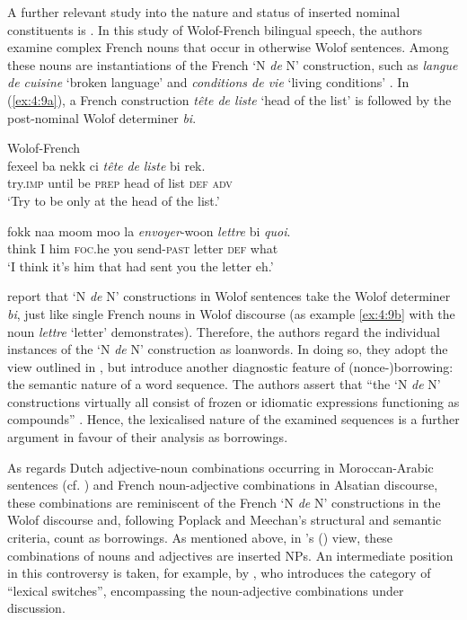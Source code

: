 A further relevant study into the nature and status of inserted nominal constituents is \citet{poplack-meechan-1995}. In this study of Wolof-French bilingual speech, the authors examine complex French nouns that occur in otherwise Wolof sentences. Among these nouns are instantiations of the French `N \textit{de} N' construction, such as \textit{langue de cuisine} `broken language' and \textit{conditions de vie} `living conditions' \citep[215]{poplack-meechan-1995}. In (\ref{ex:4:9a}), a French construction \textit{tête de liste} `head of the list' is followed by the post-nominal Wolof determiner \textit{bi}.

\ea Wolof-French \citep[215, 228]{poplack-meechan-1995}\\

\ea{\label{ex:4:9a}}
\gll fexeel ba nekk ci \textit{tête} \textit{de} \textit{liste} bi rek.\\
	try.\textsc{imp} until be \textsc{prep} head of list \textsc{def} \textsc{adv}\\
\glt `Try to be only at the head of the list.' 

\ex{\label{ex:4:9b}}
\gll fokk naa moom moo la \textit{envoyer}-woon \textit{lettre} bi \textit{quoi}.\\
	think I him \textsc{foc}.he you send-\textsc{past} letter \textsc{def} what\\
\glt `I think it's him that had sent you the letter eh.' 
\z

\z

\noindent \citet[215]{poplack-meechan-1995} report that `N \textit{de} N' constructions in Wolof sentences take the Wolof determiner \textit{bi}, just like single French nouns in Wolof discourse (as example \ref{ex:4:9b} with the noun \textit{lettre} `letter' demonstrates). Therefore, the authors regard the individual instances of the `N \textit{de} N' construction as loanwords. In doing so, they adopt the view outlined in \citet{sankoff-et-al-1990}, but introduce another diagnostic feature of (nonce-)borrowing: the semantic nature of a word sequence. The authors assert that ``the `N \textit{de} N' constructions virtually all consist of frozen or idiomatic expressions functioning as compounds'' \citep[][215]{poplack-meechan-1995}. Hence, the lexicalised nature of the examined sequences is a further argument in favour of their analysis as borrowings. 

As regards Dutch adjective-noun combinations occurring in Moroccan-Arabic sentences (cf. ) and French noun-adjective combinations in Alsatian discourse, these combinations are reminiscent of the French `N \textit{de} N' constructions in the Wolof discourse and, following Poplack and Meechan's structural and semantic criteria, count as borrowings. As mentioned above, in  \citeauthor{muysken-bilingual-2000}'s (\citeyear{muysken-bilingual-2000}) view, these combinations of nouns and adjectives are inserted NPs. An intermediate position in this controversy is taken, for example, by \citet[141]{gardner-chloros-1991}, who introduces the category of “lexical switches”, encompassing the noun-adjective combinations under discussion.

